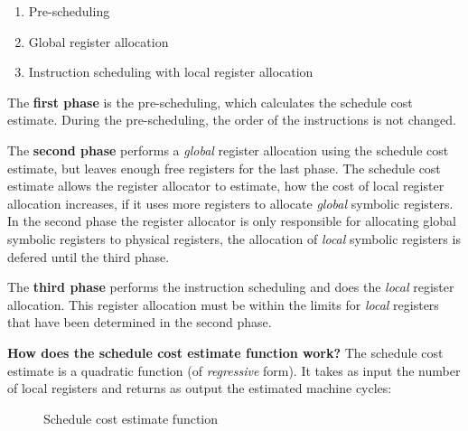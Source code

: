 \documentclass[a4paper,10pt]{article}
\begin{document}
\begin{enumerate}
 \item Pre-scheduling
 \item Global register allocation
 \item Instruction scheduling with local register allocation
\end{enumerate}

The \textbf{first phase} is the pre-scheduling, which calculates the schedule cost estimate. During the pre-scheduling, the order of the
instructions is not changed.

The \textbf{second phase} performs a \textit{global} register allocation using the schedule cost estimate, but leaves enough free
registers for the last phase. The schedule cost estimate allows the register allocator to estimate, how the cost of local register
allocation increases, if it uses more registers to allocate \textit{global} symbolic registers. In the second phase the register
allocator is only responsible for allocating global symbolic registers to physical registers, the allocation of \textit{local} symbolic
registers is defered until the third phase.

The \textbf{third phase} performs the instruction scheduling and does the \textit{local} register allocation.  This register allocation
must be within the limits for \textit{local} registers that have been determined in the second phase.

\textbf{How does the schedule cost estimate function work?} The schedule cost estimate is a quadratic function (of \textit{regressive}
form). It takes as input the number of local registers and returns as output the estimated machine cycles:
\begin{figure}[h!]
\begin{center}
\end{center}
\caption{Schedule cost estimate function}
\label{schedule-cost-estimate-function}
\end{figure}
\end{document}
